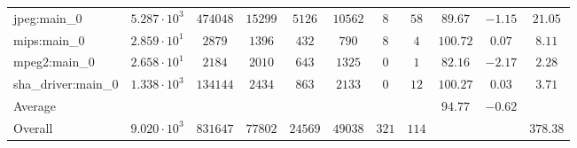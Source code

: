 \begin{tabular}{|l|c|c|c|c|c|c|c|c|c|c|}
jpeg:main\_0            & $ 5.287 \cdot 10^{3} $ & $ 474048 $ & $ 15299 $ & $ 5126  $ & $ 10562 $ & $ 8   $ & $ 58  $ & $ 89.67       $ & $ -1.15   $ & $ 21.05   $ \\
mips:main\_0            & $ 2.859 \cdot 10^{1} $ & $ 2879   $ & $ 1396  $ & $ 432   $ & $ 790   $ & $ 8   $ & $ 4   $ & $ 100.72      $ & $ 0.07    $ & $ 8.11    $ \\
mpeg2:main\_0           & $ 2.658 \cdot 10^{1} $ & $ 2184   $ & $ 2010  $ & $ 643   $ & $ 1325  $ & $ 0   $ & $ 1   $ & $ 82.16       $ & $ -2.17   $ & $ 2.28    $ \\
sha\_driver:main\_0     & $ 1.338 \cdot 10^{3} $ & $ 134144 $ & $ 2434  $ & $ 863   $ & $ 2133  $ & $ 0   $ & $ 12  $ & $ 100.27      $ & $ 0.03    $ & $ 3.71    $ \\
\hline
Average                 & $                    $ & $        $ & $       $ & $       $ & $       $ & $     $ & $     $ & $ 94.77       $ & $ -0.62   $ & $         $ \\
\hline
Overall                 & $ 9.020 \cdot 10^{3} $ & $ 831647 $ & $ 77802 $ & $ 24569 $ & $ 49038 $ & $ 321 $ & $ 114 $ & $             $ & $         $ & $ 378.38  $ \\
\hline
\end{tabular}
